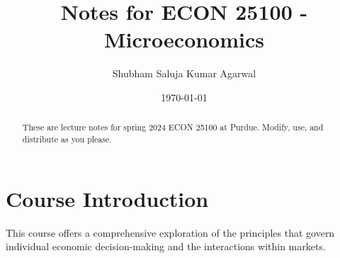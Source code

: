 \documentclass[nobib]{tufte-handout}
\title{Notes for ECON 25100 - Microeconomics}
\author[Shubham Saluja Kumar Agarwal]{Shubham Saluja Kumar Agarwal}
\date{\today}  %
\begin{document}
\maketitle

\begin{abstract}
    These are lecture notes for spring 2024 ECON 25100 at Purdue. Modify, use, and distribute as you please.
\end{abstract}

\tableofcontents

\section{Course Introduction}
This course offers a comprehensive exploration of the principles that govern
individual economic decision-making and the interactions within markets.

\pagebreak
\end{document}
